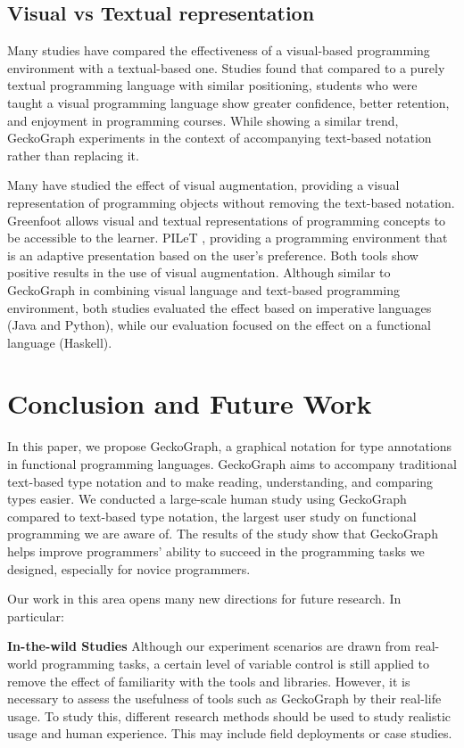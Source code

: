 \documentclass[preprint,12pt]{elsarticle}
\begin{document}
\subsection{Visual vs Textual representation}

Many studies have compared the effectiveness of a visual-based programming environment with a textual-based one. Studies \cite{Noone2018-wl, Da_Silva_Ribeiro2014-tm, Cliburn2008-jo, Daly2011-is} found that compared to a purely textual programming language with similar positioning, students who were taught a visual programming language show greater confidence, better retention, and enjoyment in programming courses. While showing a similar trend, GeckoGraph experiments in the context of accompanying text-based notation rather than replacing it. 


Many have studied the effect of visual augmentation, providing a visual representation of programming objects without removing the text-based notation. Greenfoot \cite{Montero2010-uh} allows visual and textual representations of programming concepts to be accessible to the learner. PILeT \cite{Alshaigy2015-wy}, providing a programming environment that is an adaptive presentation based on the user's preference. Both tools show positive results in the use of visual augmentation. Although similar to GeckoGraph in combining visual language and text-based programming environment, both studies evaluated the effect based on imperative languages (Java and Python), while our evaluation focused on the effect on a functional language (Haskell).

\section{Conclusion and Future Work}
In this paper, we propose GeckoGraph, a graphical notation for type annotations in functional programming languages. GeckoGraph aims to accompany traditional text-based type notation and to make reading, understanding, and comparing types easier. We conducted a large-scale human study using GeckoGraph compared to text-based type notation, the largest user study on functional programming we are aware of. The results of the study show that GeckoGraph helps improve programmers' ability to succeed in the programming tasks we designed, especially for novice programmers.

Our work in this area opens many new directions for future research.  In particular:

\noindent\textbf{In-the-wild Studies}
Although our experiment scenarios are drawn from real-world programming tasks, a certain level of variable control is still applied to remove the effect of familiarity with the tools and libraries. However, it is necessary to assess the usefulness of tools such as GeckoGraph by their real-life usage. To study this, different research methods should be used to study realistic usage and human experience. This may include field deployments or case studies. 
\end{document}
